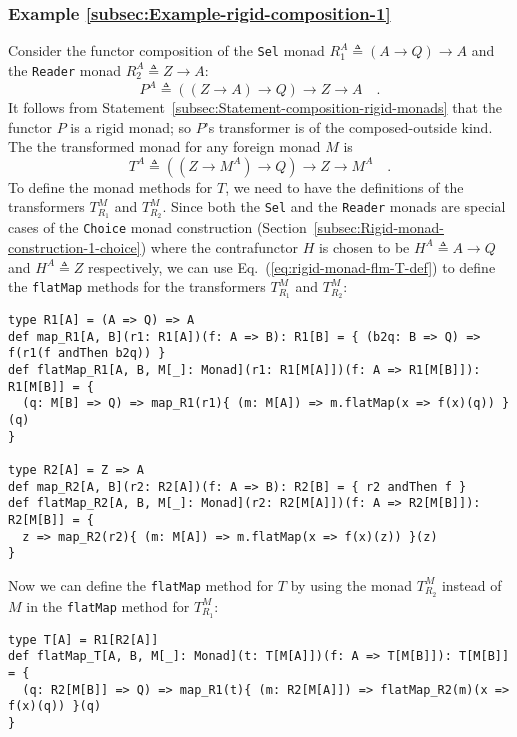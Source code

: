 \subsubsection{Example \label{subsec:Example-rigid-composition-1}\ref{subsec:Example-rigid-composition-1}}

Consider the functor composition of the \lstinline!Sel! monad $R_{1}^{A}\triangleq\left(A\rightarrow Q\right)\rightarrow A$
and the \lstinline!Reader! monad $R_{2}^{A}\triangleq Z\rightarrow A$:
\[
P^{A}\triangleq((Z\rightarrow A)\rightarrow Q)\rightarrow Z\rightarrow A\quad.
\]
It follows from Statement~\ref{subsec:Statement-composition-rigid-monads}
that the functor $P$ is a rigid monad; so $P$\textsf{'}s transformer is of
the composed-outside kind. The the transformed monad for any foreign
monad $M$ is 
\[
T^{A}\triangleq((Z\rightarrow M^{A})\rightarrow Q)\rightarrow Z\rightarrow M^{A}\quad.
\]
To define the monad methods for $T$, we need to have the definitions
of the transformers $T_{R_{1}}^{M}$ and $T_{R_{2}}^{M}$. Since both
the \lstinline!Sel! and the \lstinline!Reader! monads are special
cases of the \lstinline!Choice! monad construction (Section~\ref{subsec:Rigid-monad-construction-1-choice})
where the contrafunctor $H$ is chosen to be $H^{A}\triangleq A\rightarrow Q$
and $H^{A}\triangleq Z$ respectively, we can use Eq.~(\ref{eq:rigid-monad-flm-T-def})
to define the \lstinline!flatMap! methods for the transformers $T_{R_{1}}^{M}$
and $T_{R_{2}}^{M}$:
\begin{lstlisting}
type R1[A] = (A => Q) => A
def map_R1[A, B](r1: R1[A])(f: A => B): R1[B] = { (b2q: B => Q) => f(r1(f andThen b2q)) }
def flatMap_R1[A, B, M[_]: Monad](r1: R1[M[A]])(f: A => R1[M[B]]): R1[M[B]] = {
  (q: M[B] => Q) => map_R1(r1){ (m: M[A]) => m.flatMap(x => f(x)(q)) }(q)
}

type R2[A] = Z => A
def map_R2[A, B](r2: R2[A])(f: A => B): R2[B] = { r2 andThen f }
def flatMap_R2[A, B, M[_]: Monad](r2: R2[M[A]])(f: A => R2[M[B]]): R2[M[B]] = {
  z => map_R2(r2){ (m: M[A]) => m.flatMap(x => f(x)(z)) }(z)
}   
\end{lstlisting}
Now we can define the \lstinline!flatMap! method for $T$ by using
the monad $T_{R_{2}}^{M}$ instead of $M$ in the \lstinline!flatMap!
method for $T_{R_{1}}^{M}$:
\begin{lstlisting}
type T[A] = R1[R2[A]]
def flatMap_T[A, B, M[_]: Monad](t: T[M[A]])(f: A => T[M[B]]): T[M[B]] = {
  (q: R2[M[B]] => Q) => map_R1(t){ (m: R2[M[A]]) => flatMap_R2(m)(x => f(x)(q)) }(q)
}
\end{lstlisting}


